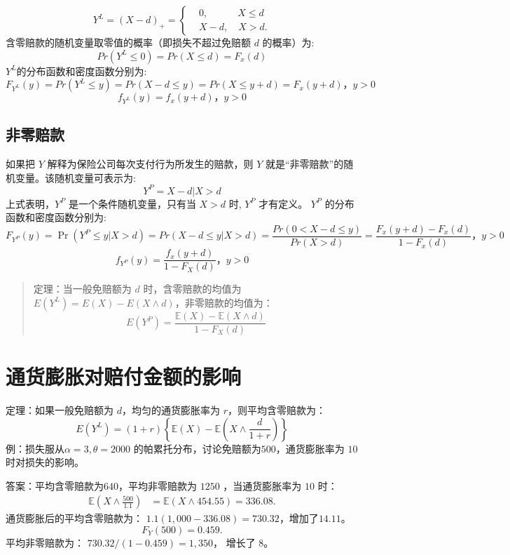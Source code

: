 \documentclass[
]{book}
\begin{document}
\[
{{Y}^{L}}={{\left( X-d \right)}_{+}}= 
\begin{cases}
  & 0,\quad \quad \quad X\le d \\ 
 & X-d,\quad X>d .
\end{cases} 
\]
含零赔款的随机变量取零值的概率（即损失不超过免赔额 \(d\) 的概率）为:
\[
Pr(Y^L≤0)=Pr(X≤d)= F_x(d)
\]
\(Y^L\)的分布函数和密度函数分别为:
\[
F_{Y^L}(y)= Pr(Y^L≤y)=Pr(X- d≤y)=Pr(X≤y+d)=F_x(y+d)，y>0\]
\[
f_{Y^L}(y)= f_x(y+d)， y>0
\]

\hypertarget{ux975eux96f6ux8d54ux6b3e}{%
\subsection{非零赔款}\label{ux975eux96f6ux8d54ux6b3e}}

如果把 \(Y\) 解释为保险公司每次支付行为所发生的赔款，则 \(Y\) 就是``非零赔款''的随机变量。该随机变量可表示为:
\[Y^P=X-d | X>d\]
上式表明，\(Y^P\) 是一个条件随机变量，只有当 \(X>d\) 时, \(Y^P\) 才有定义。
\(Y^P\) 的分布函数和密度函数分别为:
\[
F_{Y^P}(y)=\Pr(Y^{P}≤y|X>d)
=Pr(X-d≤y|X>d)
=\frac {Pr(0<X-d≤y)}{Pr(X>d)}
=\frac{F_x (y+d)-F_x(d) }{1-F_x (d)}， y>0
\]
\[f_{Y^P}(y)=\frac{ f_{x}(y+d)}{1-F_{X}(d)}， y>0\]

\begin{quote}
定理：当一般免赔额为 \(d\) 时，含零赔款的均值为\(E({Y}^{L})=E(X)-E({X}\wedge {d})\)，非零赔款的均值为：
\[
E(Y^P)=\frac{\mathbb{E}(X)-\mathbb{E}(X\wedge d)}{1-F_{X}(d)}
\]
\end{quote}

\hypertarget{ux901aux8d27ux81a8ux80c0ux5bf9ux8d54ux4ed8ux91d1ux989dux7684ux5f71ux54cd}{%
\section{通货膨胀对赔付金额的影响}\label{ux901aux8d27ux81a8ux80c0ux5bf9ux8d54ux4ed8ux91d1ux989dux7684ux5f71ux54cd}}

定理：如果一般免赔额为 \(d\)，均匀的通货膨胀率为 \(r\)，则平均含零赔款为：
\[
E(Y^L)=(1+r)\left\{
\mathbb{E}(X) - \mathbb{E}(X \wedge \frac{d}{1+r})
\right\}
\]
例：损失服从\(\alpha=3,\theta=2000\) 的帕累托分布，讨论免赔额为\(500\)，通货膨胀率为 \(10%
\) 时对损失的影响。

答案：平均含零赔款为\(640\)，平均非零赔款为 \(1250\) ，当通货膨胀率为 \(10%
\) 时：
\[
\begin{align*}
\mathbb{E}\left(X \wedge \frac{500}{1.1}\right) &= 
\mathbb{E}(X \wedge 454.55)=336.08.
\end{align*}
\]
通货膨胀后的平均含零赔款为： \(1.1(1,000 - 336.08) = 730.32\)，增加了\(14.11%
\)。
\[
F_Y(500)=0.459.
\]
平均非零赔款为： \(730.32/(1 - 0.459) = 1,350\)， 增长了 \(8%
\)。
\end{document}
